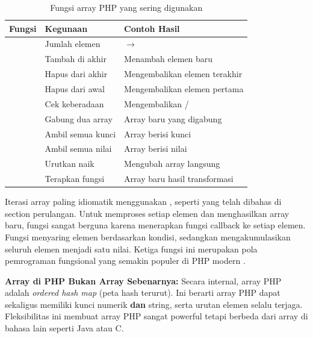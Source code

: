 \begin{table}[H]
\centering
\begin{tabular}{|P{3.5cm}|P{4cm}|P{4.5cm}|}
\hline
\textbf{Fungsi} & \textbf{Kegunaan} & \textbf{Contoh Hasil} \\
\hline
{} & Jumlah elemen &  $\rightarrow$  \\
\hline
{} & Tambah di akhir & Menambah elemen baru \\
\hline
{} & Hapus dari akhir & Mengembalikan elemen terakhir \\
\hline
{} & Hapus dari awal & Mengembalikan elemen pertama \\
\hline
{} & Cek keberadaan & Mengembalikan / \\
\hline
{} & Gabung dua array & Array baru yang digabung \\
\hline
{} & Ambil semua kunci & Array berisi kunci \\
\hline
{} & Ambil semua nilai & Array berisi nilai \\
\hline
{} & Urutkan naik & Mengubah array langsung \\
\hline
{} & Terapkan fungsi & Array baru hasil transformasi \\
\hline
\end{tabular}
\caption{Fungsi array PHP yang sering digunakan}
\end{table}

Iterasi array paling idiomatik menggunakan , seperti yang telah dibahas di section perulangan. Untuk memproses setiap elemen dan menghasilkan array baru, fungsi  sangat berguna karena menerapkan fungsi callback ke setiap elemen. Fungsi  menyaring elemen berdasarkan kondisi, sedangkan  mengakumulasikan seluruh elemen menjadi satu nilai. Ketiga fungsi ini merupakan pola pemrograman fungsional yang semakin populer di PHP modern \cite{phpRightWay}.

\begin{catatan}
\textbf{Array di PHP Bukan Array Sebenarnya:} Secara internal, array PHP adalah \textit{ordered hash map} (peta hash terurut). Ini berarti array PHP dapat sekaligus memiliki kunci numerik \textbf{dan} string, serta urutan elemen selalu terjaga. Fleksibilitas ini membuat array PHP sangat powerful tetapi berbeda dari array di bahasa lain seperti Java atau C.
\end{catatan}

